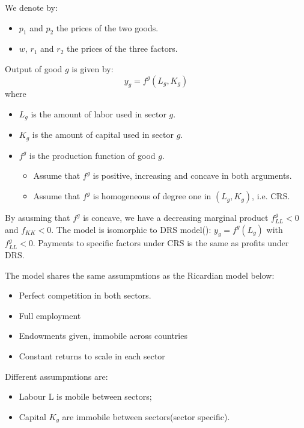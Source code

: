 We denote by:
\begin{itemize}
    \item $p_1$ and $p_2$ the prices of the two goods.
    \item $w$, $r_1$ and $r_2$ the prices of the three factors.
\end{itemize}
Output of good $g$ is given by:
\begin{equation*}
    y_g = f^g(L_g, K_g)
\end{equation*}
where
\begin{itemize}
    \item $L_g$ is the amount of labor used in sector $g$.
    \item $K_g$ is the amount of capital used in sector $g$.
    \item $f^g$ is the production function of good $g$.
        \begin{itemize}
            \item Assume that $f^g$ is positive, increasing and concave in both arguments.
            \item Assume that $f^g$ is homogeneous of degree one in $(L_g, K_g)$, i.e. CRS.
        \end{itemize}
\end{itemize}
By asusming that $f^g$ is concave, we have a decreasing marginal product $f_{LL}^g < 0$ and $f_{KK} < 0$.
The model is isomorphic to DRS model(\cite{dornbusch1977comparative}): $y_g = f^g(L_g)$ with $f_{LL}^g < 0$.
Payments to specific factors under CRS is the same as profits under DRS.

The model shares the same assumpmtions as the Ricardian model below:
\begin{itemize}
    \item Perfect competition in both sectors.
    \item Full employment
    \item Endowments given, immobile across countries
    \item Constant returns to scale in each sector
\end{itemize}
Different assumpmtions are:
\begin{itemize}
    \item Labour L is mobile between sectors;
    \item Capital $K_g$ are immobile between sectors(sector specific).
\end{itemize}


